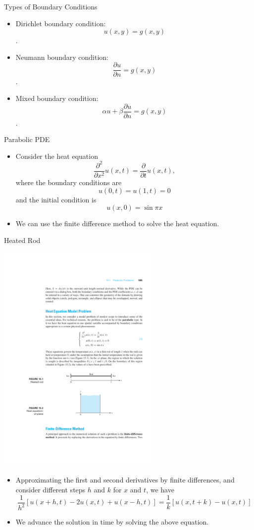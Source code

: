 \documentclass{beamer}
\begin{document}
\begin{frame}{Types of Boundary Conditions}

    \begin{itemize}
     \item Dirichlet boundary condition: $$u(x, y) = g(x, y)$$.
    \item Neumann boundary condition: $$\frac{\partial u}{\partial n} = g(x, y)$$.
    \item Mixed boundary condition: $$\alpha u + \beta \frac{\partial u}{\partial n} = g(x, y)$$.
    \end{itemize}
\end{frame}
\begin{frame}{Parabolic PDE}
    \begin{itemize}
        \item Consider the heat equation
        \[
            \frac{\partial^2}{\partial x^2} u(x, t)  =\frac{\partial}{\partial t} u(x, t), \]
            where the boundary conditions are
            \[
            u(0, t)  =u(1, t)=0 \]
            and the initial condition is 
            \[ u(x, 0)  =\sin \pi x
            \]
        \item We can use the finite difference method to solve the heat equation.
    \end{itemize}

\end{frame}
\begin{frame}{Heated Rod}
\centerline{\includegraphics[width=0.6\textwidth]{HeatedRod.pdf}}
\begin{itemize}

    \item Approximating the first and second derivatives by finite differences, and consider different steps 
    $h$ and $k$ for $x$ and $t$, we have
    \[
    \frac{1}{h^2}[u(x+h, t)-2 u(x, t)+u(x-h, t)]=\frac{1}{k}[u(x, t+k)-u(x, t)]
    \]
    \item We advance the solution in time by solving the above equation.
\end{itemize}

\end{frame}
\end{document}
